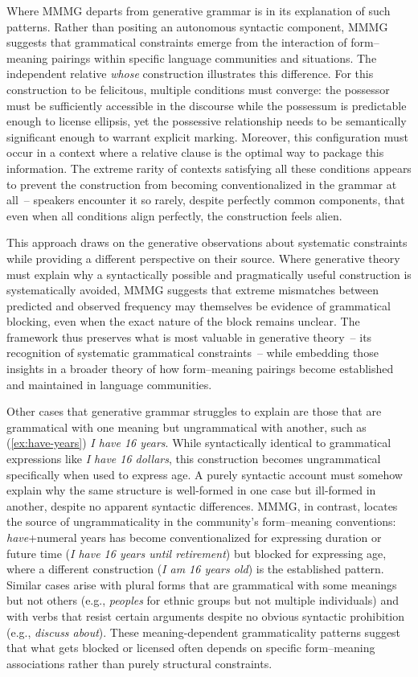\documentclass[12pt,letterpaper]{article}
\begin{document}
Where MMMG departs from generative grammar is in its explanation of such patterns. Rather than positing an autonomous syntactic component, MMMG suggests that grammatical constraints emerge from the interaction of form--meaning pairings within specific language communities and situations. The independent relative \textit{whose} construction illustrates this difference. For this construction to be felicitous, multiple conditions must converge: the possessor must be sufficiently accessible in the discourse while the possessum is predictable enough to license ellipsis, yet the possessive relationship needs to be semantically significant enough to warrant explicit marking. Moreover, this configuration must occur in a context where a relative clause is the optimal way to package this information. The extreme rarity of contexts satisfying all these conditions appears to prevent the construction from becoming conventionalized in the grammar at all~-- speakers encounter it so rarely, despite perfectly common components, that even when all conditions align perfectly, the construction feels alien.

This approach draws on the generative observations about systematic constraints while providing a different perspective on their source. Where generative theory must explain why a syntactically possible and pragmatically useful construction is systematically avoided, MMMG suggests that extreme mismatches between predicted and observed frequency may themselves be evidence of grammatical blocking, even when the exact nature of the block remains unclear. The framework thus preserves what is most valuable in generative theory~-- its recognition of systematic grammatical constraints~-- while embedding those insights in a broader theory of how form--meaning pairings become established and maintained in language communities.

Other cases that generative grammar struggles to explain are those that are grammatical with one meaning but ungrammatical with another, such as (\ref{ex:have-years}) \textit{I have 16 years}. While syntactically identical to grammatical expressions like \textit{I have 16 dollars}, this construction becomes ungrammatical specifically when used to express age. A purely syntactic account must somehow explain why the same structure is well-formed in one case but ill-formed in another, despite no apparent syntactic differences. MMMG, in contrast, locates the source of ungrammaticality in the community's form--meaning conventions: \textit{have}+numeral years has become conventionalized for expressing duration or future time (\textit{I have 16 years until retirement}) but blocked for expressing age, where a different construction (\textit{I am 16 years old}) is the established pattern. Similar cases arise with plural forms that are grammatical with some meanings but not others (e.g., \textit{peoples} for ethnic groups but not multiple individuals) and with verbs that resist certain arguments despite no obvious syntactic prohibition (e.g., \textit{discuss about}). These meaning-dependent grammaticality patterns suggest that what gets blocked or licensed often depends on specific form--meaning associations rather than purely structural constraints.
\end{document}
